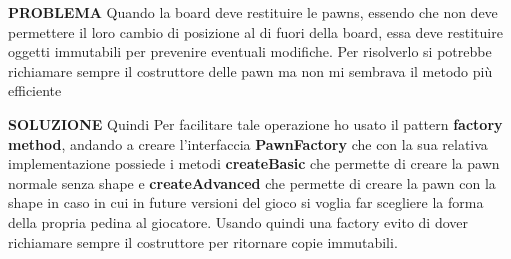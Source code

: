 \textbf{PROBLEMA}\newline
Quando la board deve restituire le pawns, essendo che non deve permettere il loro cambio di posizione al di fuori della board, 
essa deve restituire oggetti immutabili per prevenire eventuali modifiche. 
Per risolverlo si potrebbe richiamare sempre il costruttore delle pawn ma non mi sembrava il metodo più efficiente \newline

\textbf{SOLUZIONE}\newline
Quindi Per facilitare tale operazione ho usato il pattern \textbf{factory method}, andando a creare l'interfaccia \textbf{PawnFactory} 
che con la sua relativa implementazione possiede i metodi \textbf{createBasic} che permette di creare la pawn normale senza shape
e \textbf{createAdvanced} che permette di creare la pawn con la shape in caso in cui in future versioni del gioco si voglia far scegliere la forma della propria pedina al giocatore. 
Usando quindi una factory evito di dover richiamare sempre il costruttore per ritornare copie immutabili.\newline

